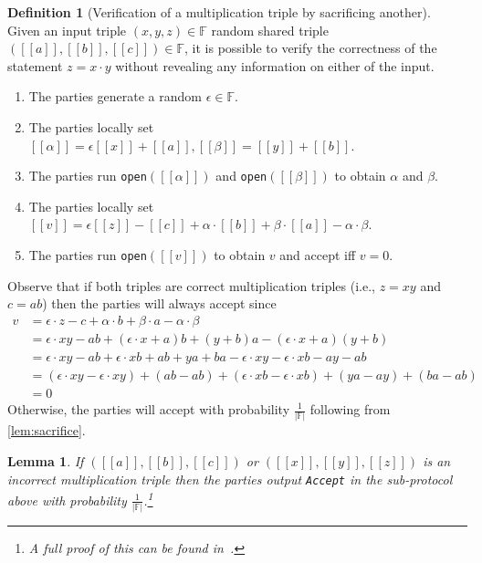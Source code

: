 \documentclass[twoside,11pt]{report}
\theoremstyle{definition}
\newtheorem{definition}{Definition}[section]
\theoremstyle{plain}
\newtheorem{lemma}{Lemma}[section]
\begin{document}
\begin{definition}[Verification of a multiplication triple by sacrificing another]\label{def:sacrifice}
  Given an input triple $(x,y,z) \in \mathbb{F}$ random shared triple $([[a]], [[b]], [[c]]) \in \mathbb{F}$, it is possible to verify the correctness of the statement $z = x \cdot y$ without revealing any information on either of the input.
  \begin{enumerate}
    \item The parties generate a random $\epsilon \in \mathbb{F}$.
    \item The parties locally set $[[\alpha]] = \epsilon[[x]] + [[a]], [[\beta]] = [[y]] + [[b]]$.
    \item The parties run \texttt{open}$([[\alpha]])$ and \texttt{open}$([[\beta]])$ to obtain $\alpha$ and $\beta$.
    \item The parties locally set $[[v]] = \epsilon[[z]] - [[c]] + \alpha  \cdot [[b]] + \beta  \cdot [[a]] - \alpha  \cdot \beta$.
    \item The parties run \texttt{open}$([[v]])$ to obtain $v$ and accept iff $v = 0$.
  \end{enumerate}
\end{definition}
Observe that if both triples are correct multiplication triples (i.e., $z = xy$ and $c = ab$) then the parties will always accept since
\begin{align}
  v & = \epsilon \cdot z - c + \alpha \cdot b + \beta \cdot a - \alpha \cdot \beta                                            \\
    & = \epsilon \cdot xy - ab + (\epsilon \cdot x + a)b + (y + b)a - (\epsilon \cdot x + a)(y + b)                           \\
    & = \epsilon \cdot xy - ab + \epsilon \cdot xb + ab + ya + ba - \epsilon \cdot xy - \epsilon \cdot xb - ay - ab           \\
    & = (\epsilon \cdot xy - \epsilon \cdot xy) + (ab - ab) + (\epsilon \cdot xb - \epsilon \cdot xb) + (ya - ay) + (ba - ab) \\
    & = 0
\end{align}
Otherwise, the parties will accept with probability $\frac{1}{|\mathbb{F}|}$ following from \autoref{lem:sacrifice}.
\begin{lemma}\label{lem:sacrifice}
  If $([[a]], [[b]], [[c]])$ or $([[x]], [[y]], [[z]])$ is an incorrect multiplication triple then the parties output \texttt{Accept} in the sub-protocol above with probability $\frac{1}{|\mathbb{F}|}$.\footnote{A full proof of this can be found in~\cite{baum2020concretely}.}
\end{lemma}
\end{document}

